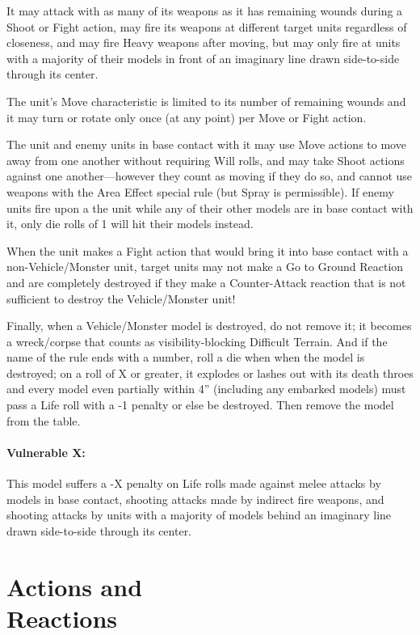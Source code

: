 \begin{multicols}{2}
It may attack with as many of its weapons as it has remaining wounds during a Shoot or Fight action, may fire its weapons at different target units regardless of closeness, and may fire Heavy weapons after moving, but may only fire at units with a majority of their models in front of an imaginary line drawn side-to-side through its center.

The unit's Move characteristic is limited to its number of remaining wounds and it may turn or rotate only once (at any point) per Move or Fight action.

The unit and enemy units in base contact with it may use Move actions to move away from one another without requiring Will rolls, and may take Shoot actions against one another—however they count as moving if they do so, and cannot use weapons with the Area Effect special rule (but Spray is permissible). If enemy units fire upon a the unit while any of their other models are in base contact with it, only die rolls of 1 will hit their models instead.

When the unit makes a Fight action that would bring it into base contact with a non-Vehicle/Monster unit, target units may not make a Go to Ground Reaction and are completely destroyed if they make a Counter-Attack reaction that is not sufficient to destroy the Vehicle/Monster unit!

Finally, when a Vehicle/Monster model is destroyed, do not remove it; it becomes a wreck/corpse that counts as visibility-blocking Difficult Terrain. And if the name of the rule ends with a number, roll a die when when the model is destroyed; on a roll of X or greater, it explodes or lashes out with its death throes and every model even partially within 4'' (including any embarked models) must pass a Life roll with a -1 penalty or else be destroyed. Then remove the model from the table.

\subsubsection*{Vulnerable X:} This model suffers a -X penalty on Life rolls made against melee attacks by models in base contact, shooting attacks made by indirect fire weapons, and shooting attacks by units with a majority of models behind an imaginary line drawn side-to-side through its center.




\chapter*{Actions and\\ Reactions}


\end{multicols}
